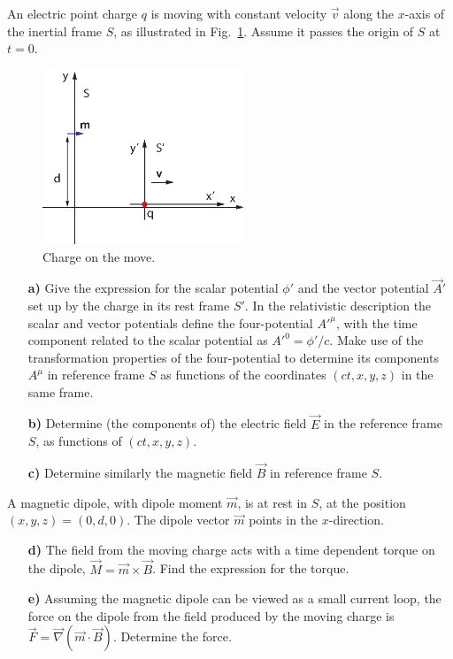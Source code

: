 \documentclass[11pt,a4paper]{report}
\newcounter{excount}[chapter]
\newenvironment{exercise}[1][]{\addtocounter{excount}{1} \noindent {\bf Problem
    \arabic{excount} \ \ #1}\hspace{2mm}}{\vspace{4mm}}
\begin{document}
\begin{exercise}
An electric point charge $q$ is moving with constant velocity $\vec v$ along the $x$-axis of the inertial frame $S$, as illustrated in Fig.~\ref{fig:dipole}. Assume it passes the origin of $S$ at $t=0$.

\begin{figure}[h]
\begin{center}
\includegraphics[width=6cm]{dipole.eps}
\end{center}
\caption{Charge on the move. \label{fig:dipole}}
\end{figure}

\begin{itemize}
\item[{\bf a)}] Give the expression for the scalar potential $\phi'$ and the vector potential $\vec A'$ set up by the charge in its rest frame $S'$. In the relativistic description the scalar and vector potentials define the four-potential $A'^\mu$, with the time component related to the scalar potential as $A'^0=\phi'/c$.  Make use of the transformation properties of the four-potential to determine its components $A^\mu$ in reference frame $S$ as functions of the coordinates $(ct, x, y, z)$ in the same frame.
\item[{\bf b)}] Determine (the components of) the electric field  $\vec E$  in the reference frame $S$, as functions of $(ct, x, y, z)$.
\item[{\bf c)}] Determine similarly the magnetic field  $\vec B$  in reference frame $S$.
\end{itemize}

\smallskip
A magnetic dipole, with dipole moment $\vec m$, is at rest in $S$, at the position $(x,y,z)=(0,d,0)$. The dipole vector $\vec m$ points in the $x$-direction.

\begin{itemize}
\item[{\bf d)}] The field from the moving charge acts with a time dependent torque on the dipole, $\vec M=\vec m\times \vec B$. Find the expression for the torque.
\item[{\bf e)}] Assuming the magnetic dipole can be viewed as a small current loop, the force on the dipole from the field produced by the moving charge is $\vec F=\vec\nabla(\vec m\cdot \vec B)$. Determine the force. 
\end{itemize}
\end{exercise}

\end{document}
